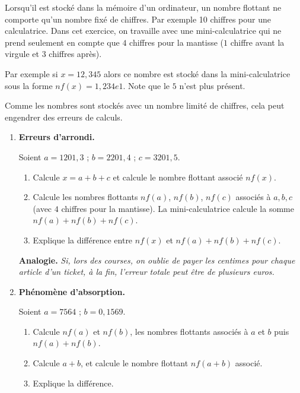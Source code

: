 \documentclass[class=report,crop=false, 12pt]{standalone}
\begin{document}
\begin{activite}

Lorsqu'il est stocké dans la mémoire d'un ordinateur, un nombre flottant ne comporte qu'un nombre fixé de chiffres. Par exemple 10 chiffres pour une calculatrice. Dans cet exercice, on travaille avec une mini-calculatrice qui ne prend seulement en compte que $4$ chiffres pour la mantisse ($1$ chiffre avant la virgule et $3$ chiffres après).  

Par exemple si $x = 12,345$ alors ce nombre est stocké dans la mini-calculatrice sous la forme $nf(x) = 1,234e1$. Note que le $5$ n'est plus présent.

Comme les nombres sont stockés avec un nombre limité de chiffres, cela peut engendrer des erreurs de calculs.

\begin{enumerate}
  \item \textbf{Erreurs d'arrondi.}

    Soient $a = 1201,3$ ; $b = 2201,4$ ; $c = 3201,5$.
  \begin{enumerate}
    \item Calcule $x = a + b + c$ et calcule le nombre flottant associé $nf(x)$.
    \item Calcule les nombres flottants $nf(a)$, $nf(b)$, $nf(c)$ associés à $a, b, c$ (avec $4$ chiffres pour la mantisse). La mini-calculatrice calcule la somme $nf(a) + nf(b) + nf(c)$.
    \item Explique la différence entre $nf(x)$ et $nf(a) + nf(b) + nf(c)$.
  \end{enumerate}

    \textbf{Analogie.} \emph{Si, lors des courses, on oublie de payer les centimes pour chaque article d'un ticket, à la fin, l'erreur totale peut être de plusieurs euros.}
  
  \item \textbf{Phénomène d'absorption.}

    Soient $a = 7564$ ; $b = 0,1569$.
  \begin{enumerate}
    \item Calcule $nf(a)$ et $nf(b)$, les nombres flottants associés à $a$ et $b$ puis $nf(a) + nf(b)$.
    \item Calcule $a + b$, et calcule le nombre flottant $nf(a + b)$ associé.
    \item Explique la différence.
  \end{enumerate}


\end{enumerate}
\end{activite}
\end{document}
